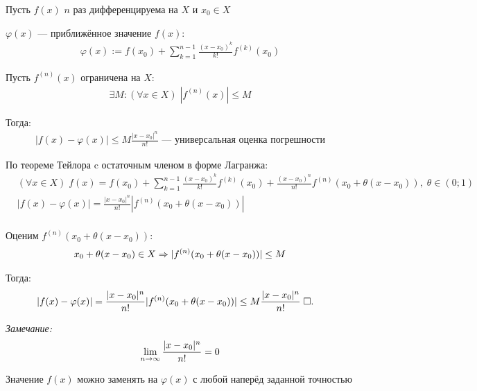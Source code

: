 \documentclass{article}
\begin{document}

\theorem

Пусть $f(x)$ $n$ раз дифференцируема на $X$ и $x_0\in X$

$\varphi(x)$ --- приближённое значение $f(x)$:
\begin{align*}
	\varphi(x):=f(x_0)+\sum_{k=1}^{n-1}\frac{(x-x_0)^{k}}{k!}f^{(k)}(x_0)
\end{align*}

Пусть $f^{(n)}(x)$ ограничена на $X$:
\begin{align*}
	\exists M:(\forall x\in X)\;|f^{(n)}(x)|\leq M
\end{align*}

Тогда:
\begin{align*}
	|f(x)-\varphi(x)|\leq M\frac{|x-x_0|^{n}}{n!}\text{ --- универсальная оценка погрешности}
\end{align*}

\proof

По теореме Тейлора c остаточным членом в форме Лагранжа:
\begin{align*}
	 & (\forall x\in X)\;f(x)=f(x_0)+\sum_{k=1}^{n-1}\frac{(x-x_0)^{k}}{k!}f^{(k)}(x_0)+\frac{(x-x_0)^{n}}{n!}f^{(n)}(x_0+\theta(x-x_0)),\;\theta\in(0;1) \\
	 & |f(x)-\varphi(x)|=\frac{|x-x_0|^{n}}{n!}|f^{(n)}(x_0+\theta(x-x_0))|                                                                               \\
\end{align*}

Оценим $f^{(n)}(x_0+\theta(x-x_0))$:
\begin{align*}
	x_0+\theta(x-x_0)\in X\Rarr |f^{(n)}(x_0+\theta(x-x_0))|\leq M
\end{align*}

Тогда:
\begin{align*}
	 & |f(x)-\varphi(x)|=\frac{|x-x_0|^{n}}{n!}|f^{(n)}(x_0+\theta(x-x_0))|\leq M\frac{|x-x_0|^{n}}{n!}\qed
\end{align*}

{\it Замечание:}
\begin{align*}
	\slimty\frac{|x-x_0|^{n}}{n!}=0
\end{align*}

\result

Значение $f(x)$ можно заменять на $\varphi(x)$ с любой наперёд заданной точностью
\end{document}

